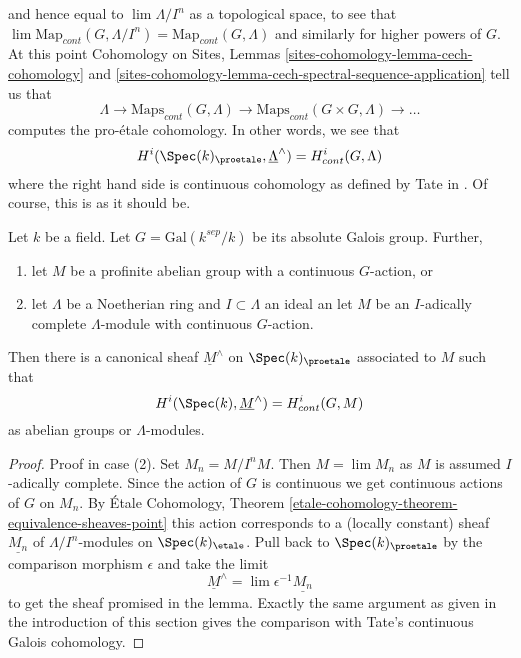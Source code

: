 and hence equal to $\lim \Lambda/I^n$ as a topological space, to see that
$\lim \text{Map}_{cont}(G, \Lambda/I^n) = \text{Map}_{cont}(G, \Lambda)$
and similarly for higher powers of $G$.
At this point Cohomology on Sites, Lemmas
\ref{sites-cohomology-lemma-cech-cohomology}  and
\ref{sites-cohomology-lemma-cech-spectral-sequence-application}
tell us that
$$
\Lambda \to \text{Maps}_{cont}(G, \Lambda) \to
\text{Maps}_{cont}(G \times G, \Lambda) \to \ldots
$$
computes the pro-\'etale cohomology. In other words, we see that
$$
H^i(\Spec(k)_\proetale, \underline{\Lambda}^\wedge)
=
H^i_{cont}(G, \Lambda)
$$
where the right hand side is continuous cohomology as defined by
Tate in \cite{Tate}. Of course, this is as it should be.

\begin{lemma}
\label{lemma-more-general-point}
Let $k$ be a field. Let $G = \text{Gal}(k^{sep}/k)$ be its absolute
Galois group. Further, 
\begin{enumerate}
\item let $M$ be a profinite abelian group with a continuous
$G$-action, or
\item let $\Lambda$ be a Noetherian ring and $I \subset \Lambda$ an ideal
an let $M$ be an $I$-adically complete $\Lambda$-module with continuous
$G$-action.
\end{enumerate}
Then there is a canonical sheaf $\underline{M}^\wedge$ on
$\Spec(k)_\proetale$ associated to $M$ such that
$$
H^i(\Spec(k), \underline{M}^\wedge) = H^i_{cont}(G, M)
$$
as abelian groups or $\Lambda$-modules.
\end{lemma}

\begin{proof}
Proof in case (2). Set $M_n = M/I^nM$. Then $M = \lim M_n$ as $M$ is
assumed $I$-adically complete. Since the action of $G$ is continuous
we get continuous actions of $G$ on $M_n$. By \'Etale Cohomology, Theorem
\ref{etale-cohomology-theorem-equivalence-sheaves-point}
this action corresponds to a (locally constant) sheaf
$\underline{M_n}$ of $\Lambda/I^n$-modules on $\Spec(k)_\etale$.
Pull back to $\Spec(k)_\proetale$ by the comparison morphism
$\epsilon$ and take the limit
$$
\underline{M}^\wedge = \lim \epsilon^{-1}\underline{M_n}
$$
to get the sheaf promised in the lemma. Exactly the same argument as
given in the introduction of this section gives the comparison
with Tate's continuous Galois cohomology.
\end{proof}






